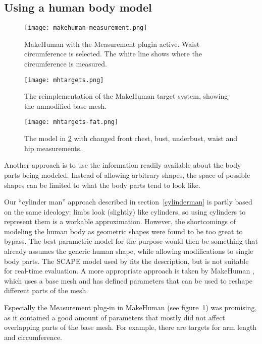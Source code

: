 \subsection{Using a human body model}

\begin{figure}
    \centering
    \texttt{[image: makehuman-measurement.png]}
    \caption{MakeHuman with the Measurement plugin active. Waist circumference is selected. The white line shows where the circumference is measured.}
    \label{fig:makehuman-measurement}
\end{figure}

\begin{figure}
    \centering
    \texttt{[image: mhtargets.png]}
    \caption{The reimplementation of the MakeHuman target system, showing the unmodified base mesh.}
    \label{fig:mhtargets}
\end{figure}

\begin{figure}
    \centering
    \texttt{[image: mhtargets-fat.png]}
    \caption{The model in \ref{fig:mhtargets} with changed front chest, bust, underbust, waist and hip measurements.}
    \label{fig:mhtargets-fat}
\end{figure}

Another approach is to use the information readily available about the body parts being modeled. Instead of allowing arbitrary shapes, the space of possible shapes can be limited to what the body parts tend to look like.

Our ``cylinder man'' approach described in section~\ref{cylinderman} is partly based on the same ideology: limbs look (slightly) like cylinders, so using cylinders to represent them is a workable approximation. However, the shortcomings of modeling the human body as geometric shapes were found to be too great to bypass. The best parametric model for the purpose would then be something that already assumes the generic human shape, while allowing modifications to single body parts. The SCAPE model \citep{anguelov2005scape} used by \citet{weiss2011home} fits the description, but is not suitable for real-time evaluation. A more appropriate approach is taken by MakeHuman \citep{makehuman}, which uses a base mesh and has defined parameters that can be used to reshape different parts of the mesh.

Especially the Measurement plug-in in MakeHuman (see figure~\ref{fig:makehuman-measurement}) was promising, as it contained a good amount of parameters that mostly did not affect overlapping parts of the base mesh. For example, there are targets for arm length and circumference.

